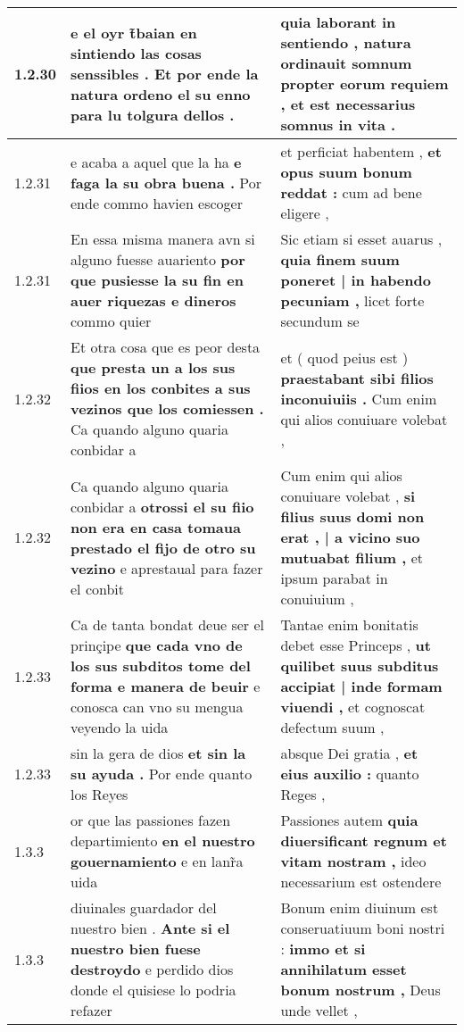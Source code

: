 \begin{tabular}{|p{1cm}|p{6.5cm}|p{6.5cm}|}
1.2.30 & e el oyr t̃baian en sintiendo las cosas senssibles . \textbf{ Et por ende la natura ordeno el su enno } para lu tolgura dellos . & quia laborant in sentiendo , \textbf{ natura ordinauit somnum propter eorum requiem , } et est necessarius somnus in vita . \\\hline
1.2.31 & e acaba a aquel que la ha \textbf{ e faga la su obra buena . } Por ende commo havien escoger & et perficiat habentem , \textbf{ et opus suum bonum reddat : } cum ad bene eligere , \\\hline
1.2.31 & En essa misma manera avn si alguno fuesse auariento \textbf{ por que pusiesse la su fin en auer riquezas e dineros } commo quier & Sic etiam si esset auarus , \textbf{ quia finem suum poneret | in habendo pecuniam , } licet forte secundum se \\\hline
1.2.32 & Et otra cosa que es peor desta \textbf{ que presta un a los sus fiios en los conbites a sus vezinos que los comiessen . } Ca quando alguno quaria conbidar a & et ( quod peius est ) \textbf{ praestabant sibi filios inconuiuiis . } Cum enim qui alios conuiuare volebat , \\\hline
1.2.32 & Ca quando alguno quaria conbidar a \textbf{ otrossi el su fiio non era en casa tomaua prestado el fijo de otro su vezino } e aprestaual para fazer el conbit & Cum enim qui alios conuiuare volebat , \textbf{ si filius suus domi non erat , | a vicino suo mutuabat filium , } et ipsum parabat in conuiuium , \\\hline
1.2.33 & Ca de tanta bondat deue ser el prinçipe \textbf{ que cada vno de los sus subditos tome del forma e manera de beuir } e conosca can vno su mengua veyendo la uida & Tantae enim bonitatis debet esse Princeps , \textbf{ ut quilibet suus subditus accipiat | inde formam viuendi , } et cognoscat defectum suum , \\\hline
1.2.33 & sin la gera de dios \textbf{ et sin la su ayuda . } Por ende quanto los Reyes & absque Dei gratia , \textbf{ et eius auxilio : } quanto Reges , \\\hline
1.3.3 & or que las passiones fazen departimiento \textbf{ en el nuestro gouernamiento } e en lanr̃a uida & Passiones autem \textbf{ quia diuersificant regnum et vitam nostram , } ideo necessarium est ostendere \\\hline
1.3.3 & diuinales guardador del nuestro bien . \textbf{ Ante si el nuestro bien fuese destroydo } e perdido dios donde el quisiese lo podria refazer & Bonum enim diuinum est conseruatiuum boni nostri : \textbf{ immo et si annihilatum esset bonum nostrum , } Deus unde vellet , \\\hline

\end{tabular}
